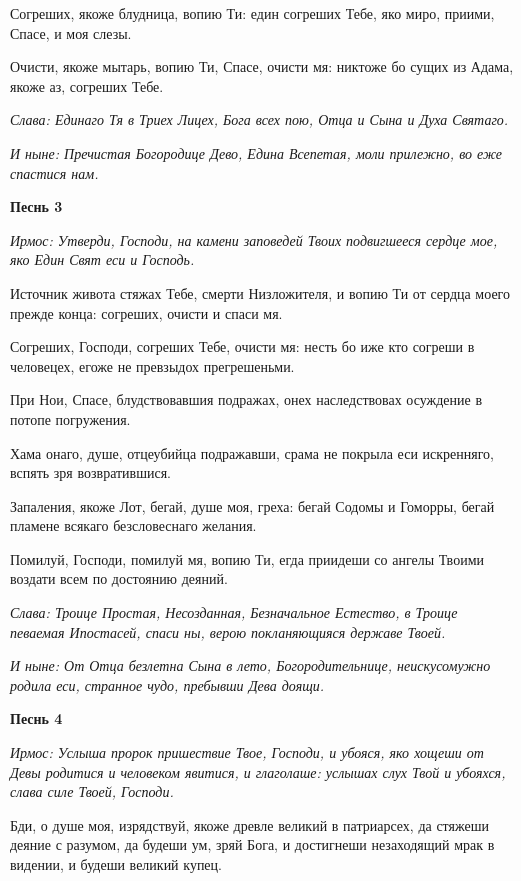 Согреших, якоже блудница, вопию Ти: един согреших Тебе, яко миро, приими, Спасе, и моя слезы. 

Очисти, якоже мытарь, вопию Ти, Спасе, очисти мя: никтоже бо сущих из Адама, якоже аз, согреших Тебе. 

\itshape Слава\normalfont{}: Единаго Тя в Триех Лицех, Бога всех пою, Отца и Сына и Духа Святаго. 

\itshape И ныне\normalfont{}: Пречистая Богородице Дево, Едина Всепетая, моли прилежно, во еже спастися нам. 

\medskip\bfseries Песнь 3\normalfont{}

\itshape Ирмос\normalfont{}: Утверди, Господи, на камени заповедей Твоих подвигшееся сердце мое, яко Един Свят еси и Господь. 

Источник живота стяжах Тебе, смерти Низложителя, и вопию Ти от сердца моего прежде конца: согреших, очисти и спаси мя. 

Согреших, Господи, согреших Тебе, очисти мя: несть бо иже кто согреши в человецех, егоже не превзыдох прегрешеньми. 

При Нои, Спасе, блудствовавшия подражах, онех наследствовах осуждение в потопе погружения. 

Хама онаго, душе, отцеубийца подражавши, срама не покрыла еси искренняго, вспять зря возвратившися. 

Запаления, якоже Лот, бегай, душе моя, греха: бегай Содомы и Гоморры, бегай пламене всякаго безсловеснаго желания. 

Помилуй, Господи, помилуй мя, вопию Ти, егда приидеши со ангелы Твоими воздати всем по достоянию деяний. 

\itshape Слава\normalfont{}: Троице Простая, Несозданная, Безначальное Естество, в Троице певаемая Ипостасей, спаси ны, верою покланяющияся державе Твоей. 

\itshape И ныне\normalfont{}: От Отца безлетна Сына в лето, Богородительнице, неискусомужно родила еси, странное чудо, пребывши Дева доящи. 

\medskip\bfseries Песнь 4\normalfont{}

\itshape Ирмос\normalfont{}: Услыша пророк пришествие Твое, Господи, и убояся, яко хощеши от Девы родитися и человеком явитися, и глаголаше: услышах слух Твой и убояхся, слава силе Твоей, Господи. 

Бди, о душе моя, изрядствуй, якоже древле великий в патриарсех, да стяжеши деяние с разумом, да будеши ум, зряй Бога, и достигнеши незаходящий мрак в видении, и будеши великий купец. 

